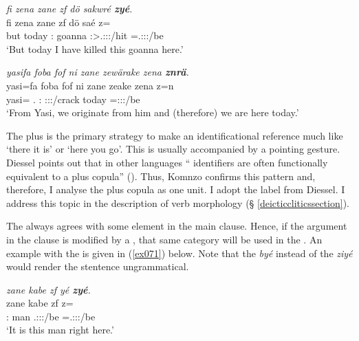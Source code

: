 \begin{exe}
	\ex \emph{fi zena zane zf dö sakwré \textbf{zyé}.}\\
	\gll fi zena zane zf dö saé z=\\
	but today \Dem:\Prox{} \Imm{} goanna \Fsg:\Sbj>\Tsg.\Masc:\Obj:\Rpst:\Pfv/hit \Prox=\Tsg.\Masc:\Sbj:\Nonpast:\Ipfv/be\\
	\trans `But today I have killed this goanna here.'
	\label{ex068}
\end{exe}
\begin{exe}
	\ex \emph{yasifa foba fof ni zane zewärake zena \textbf{znrä}.}\\
	\gll yasi=fa foba fof ni zane zeake zena z=n\\
	yasi=\Abl{} \Dist.\Abl{} \Emph{} \Fnsg{} \Dem:\Prox{} \Fpl:\Sbj:\Pst:\Ipfv/crack today \Prox=\Fpl:\Sbj:\Nonpast:\Ipfv/be\\
	\trans `From Yasi, we originate from him and (therefore) we are here today.'\\
	\label{ex070}
\end{exe}

The   plus  is the primary strategy to make an identificational reference much like  `there it is' or `here you go'. This is usually accompanied by a pointing gesture. Diessel points out that in other languages `` identifiers are often functionally equivalent to a  plus copula'' (\citeyear[10]{Diessel:2009tg}). Thus, Komnzo confirms this pattern and, therefore, I analyse the   plus copula as one unit. I adopt the label   from Diessel. I address this topic in the description of verb morphology (\S{} \ref{deicticcliticssection}).%

The   always agrees with some element in the main clause. Hence, if the argument in the clause is modified by a  , that same  category will be used in the  . An example with the  is given in (\ref{ex071}) below. Note that the    \emph{byé} instead of the  \emph{ziyé} would render the stentence ungrammatical.

\begin{exe}
	\ex \emph{zane kabe zf yé \textbf{zyé}.}\\
	\gll zane kabe zf  z=\\
	\Dem:\Prox{} man \Imm{} \Tsg.\Masc:\Sbj:\Nonpast:\Ipfv/be \Prox=\Tsg.\Masc:\Sbj:\Nonpast:\Ipfv/be\\
	\trans `It is this man right here.'
	\label{ex071}
\end{exe}

